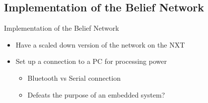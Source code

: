 \subsection{Implementation of the Belief Network}
\begin{frame}{Implementation of the Belief Network}
\begin{itemize}
\item Have a scaled down version of the network on the NXT
\item Set up a connection to a PC for processing power
\begin{itemize}
   \item Bluetooth vs Serial connection
   \item Defeats the purpose of an embedded system?
   \end{itemize}
\end{itemize}
\end{frame}
